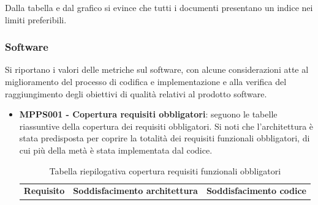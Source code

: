 \documentclass[openany,12pt,a4paper]{report}
\begin{document}
\begin{itemize}
	Dalla tabella e dal grafico si evince che tutti i documenti presentano un indice nei limiti preferibili.	
\end{itemize}

\subsubsection{Software}

Si riportano i valori delle metriche sul software, con alcune considerazioni atte al miglioramento del processo di codifica e implementazione e alla verifica del raggiungimento degli obiettivi di qualità relativi al prodotto software.

\begin{itemize}
	\item \textbf{MPPS001 - Copertura requisiti obbligatori}: seguono le tabelle riassuntive della copertura dei requisiti obbligatori. Si noti che l'architettura è stata predisposta per coprire la totalità dei requisiti funzionali obbligatori, di cui più della metà è stata implementata dal codice.
	
	\begin{longtable}{|p{40mm}|p{40mm}|p{40mm}|}
		\caption{Tabella riepilogativa copertura requisiti funzionali obbligatori} \\
		\hline
		\centering \textbf{Requisito} & \textbf{Soddisfacimento architettura} &  \textbf{Soddisfacimento codice}\\
		

\end{longtable}
\end{itemize}
\end{document}
